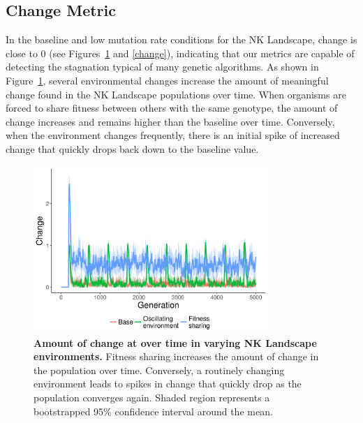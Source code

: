 \documentclass[letterpaper]{article}
\begin{document}
\subsection{Change Metric}
In the baseline and low mutation rate conditions for the NK Landscape, change is close to 0 (see Figures~\ref{change_time} and \ref{change}), indicating that our metrics are capable of detecting the stagnation typical of many genetic algorithms. As shown in Figure~\ref{change_time}, several environmental changes increase the amount of meaningful change found in the NK Landscape populations over time. When organisms are forced to share fitness between others with the same genotype, the amount of change increases and remains higher than the baseline over time. Conversely, when the environment changes frequently, there is an initial spike of increased change that quickly drops back down to the baseline value.

\begin{figure}
    \centering
\includegraphics[width=3.5in]{figs/dolson.change_changing_environments.png}
\caption{\textbf{Amount of change at over time in varying NK Landscape environments.} Fitness sharing increases the amount of change in the population over time. Conversely, a routinely changing environment leads to spikes in change that quickly drop as the population converges again. Shaded region represents a bootstrapped 95\% confidence interval around the mean.\label{change_time}}
\end{figure}
\end{document}
